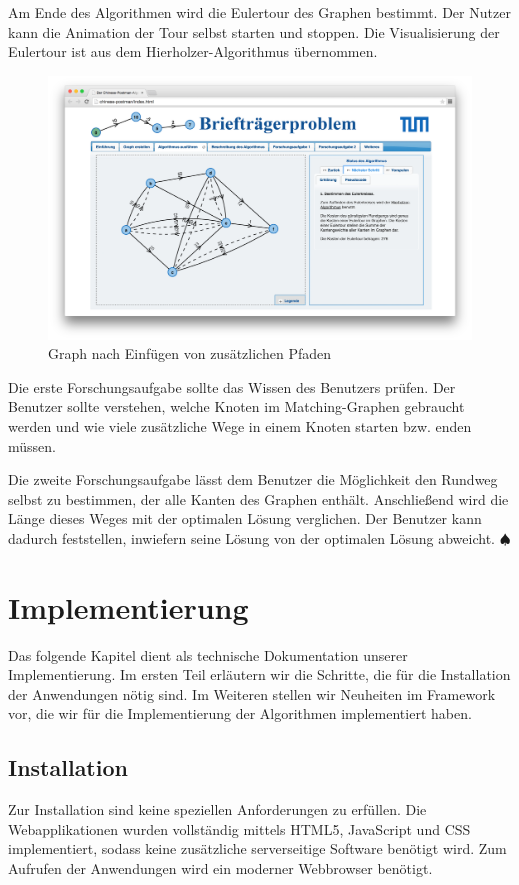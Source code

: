 Am Ende des Algorithmen wird die Eulertour des Graphen bestimmt. Der Nutzer kann die Animation der Tour selbst starten und stoppen. Die Visualisierung der Eulertour ist aus dem Hierholzer-Algorithmus übernommen.

\begin{figure}[h!]
	\centering
	\includegraphics[width=\textwidth]{figures/postman_eulerian}
	\caption[Chinese-Postman: Eulerscher Graph]{Graph nach Einfügen von zusätzlichen Pfaden}\label{fig:postman_eulerian}
\end{figure}

Die erste Forschungsaufgabe sollte das Wissen des Benutzers prüfen. Der Benutzer sollte verstehen, welche Knoten im Matching-Graphen gebraucht werden und wie viele zusätzliche Wege in einem Knoten starten bzw. enden müssen.

Die zweite Forschungsaufgabe lässt dem Benutzer die Möglichkeit den Rundweg selbst zu bestimmen, der alle Kanten des Graphen enthält. Anschließend wird die Länge dieses Weges mit der optimalen Lösung verglichen. Der Benutzer kann dadurch feststellen, inwiefern seine Lösung von der optimalen Lösung abweicht. \hfill$\spadesuit$

\chapter{Implementierung}
Das folgende Kapitel dient als technische Dokumentation unserer Implementierung. Im ersten Teil erläutern wir die Schritte, die für die Installation der Anwendungen nötig sind. Im Weiteren stellen wir Neuheiten im Framework vor, die wir für die Implementierung der Algorithmen implementiert haben.

\section{Installation} %
Zur Installation sind keine speziellen Anforderungen zu erfüllen. Die Webapplikationen wurden vollständig mittels HTML5, JavaScript und CSS implementiert, sodass keine zusätzliche serverseitige Software benötigt wird. Zum Aufrufen der Anwendungen wird ein moderner Webbrowser benötigt.

